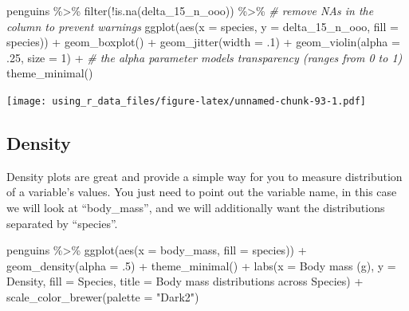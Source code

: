 \documentclass[
]{book}
\newenvironment{Shaded}{\begin{snugshade}}{\end{snugshade}}
\newcommand{\AttributeTok}[1]{\textcolor[rgb]{0.77,0.63,0.00}{#1}}
\newcommand{\CommentTok}[1]{\textcolor[rgb]{0.56,0.35,0.01}{\textit{#1}}}
\newcommand{\DecValTok}[1]{\textcolor[rgb]{0.00,0.00,0.81}{#1}}
\newcommand{\FunctionTok}[1]{\textcolor[rgb]{0.00,0.00,0.00}{#1}}
\newcommand{\NormalTok}[1]{#1}
\newcommand{\SpecialCharTok}[1]{\textcolor[rgb]{0.00,0.00,0.00}{#1}}
\newcommand{\StringTok}[1]{\textcolor[rgb]{0.31,0.60,0.02}{#1}}
\begin{document}
\begin{Shaded}
\begin{Highlighting}[]
\NormalTok{penguins }\SpecialCharTok{\%\textgreater{}\%}
  \FunctionTok{filter}\NormalTok{(}\SpecialCharTok{!}\FunctionTok{is.na}\NormalTok{(delta\_15\_n\_ooo)) }\SpecialCharTok{\%\textgreater{}\%}  \CommentTok{\# remove NAs in the column to prevent warnings}
  \FunctionTok{ggplot}\NormalTok{(}\FunctionTok{aes}\NormalTok{(}\AttributeTok{x =}\NormalTok{ species, }\AttributeTok{y =}\NormalTok{ delta\_15\_n\_ooo, }\AttributeTok{fill =}\NormalTok{ species)) }\SpecialCharTok{+} 
  \FunctionTok{geom\_boxplot}\NormalTok{() }\SpecialCharTok{+}
  \FunctionTok{geom\_jitter}\NormalTok{(}\AttributeTok{width =}\NormalTok{ .}\DecValTok{1}\NormalTok{) }\SpecialCharTok{+}
  \FunctionTok{geom\_violin}\NormalTok{(}\AttributeTok{alpha =}\NormalTok{ .}\DecValTok{25}\NormalTok{, }\AttributeTok{size =} \DecValTok{1}\NormalTok{) }\SpecialCharTok{+}  \CommentTok{\# the alpha parameter models transparency (ranges from 0 to 1)}
  \FunctionTok{theme\_minimal}\NormalTok{()}
\end{Highlighting}
\end{Shaded}

\texttt{[image: using\_r\_data\_files/figure-latex/unnamed-chunk-93-1.pdf]}

\hypertarget{density}{%
\subsection{Density}\label{density}}

Density plots are great and provide a simple way for you to measure distribution of a variable's values.
You just need to point out the variable name, in this case we will look at ``body\_mass'', and we will additionally want the distributions separated by ``species''.

\begin{Shaded}
\begin{Highlighting}[]
\NormalTok{penguins }\SpecialCharTok{\%\textgreater{}\%} 
  \FunctionTok{ggplot}\NormalTok{(}\FunctionTok{aes}\NormalTok{(}\AttributeTok{x =}\NormalTok{ body\_mass, }\AttributeTok{fill =}\NormalTok{ species)) }\SpecialCharTok{+} 
  \FunctionTok{geom\_density}\NormalTok{(}\AttributeTok{alpha =}\NormalTok{ .}\DecValTok{5}\NormalTok{) }\SpecialCharTok{+}
  \FunctionTok{theme\_minimal}\NormalTok{() }\SpecialCharTok{+}
  \FunctionTok{labs}\NormalTok{(}\AttributeTok{x =} \StringTok{\textquotesingle{}Body mass (g)\textquotesingle{}}\NormalTok{, }\AttributeTok{y =} \StringTok{\textquotesingle{}Density\textquotesingle{}}\NormalTok{,}
       \AttributeTok{fill =} \StringTok{\textquotesingle{}Species\textquotesingle{}}\NormalTok{, }
       \AttributeTok{title =} \StringTok{\textquotesingle{}Body mass distributions across Species\textquotesingle{}}\NormalTok{) }\SpecialCharTok{+}
  \FunctionTok{scale\_color\_brewer}\NormalTok{(}\AttributeTok{palette =} \StringTok{"Dark2"}\NormalTok{)}
\end{Highlighting}
\end{Shaded}
\end{document}
